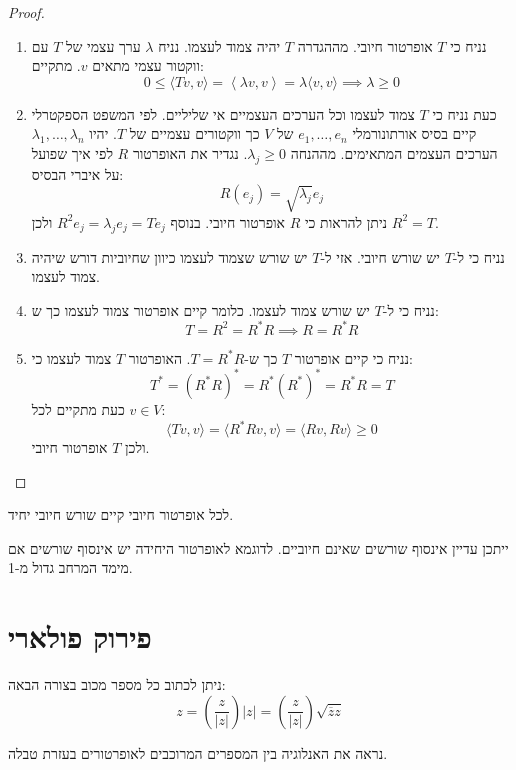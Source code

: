 \documentclass{tstextbook}
\begin{document}
\begin{proof}
  \begin{enumerate}
    \item נניח כי \(T\) אופרטור חיובי. מההגדרה \(T\) יהיה צמוד לעצמו. נניח \(\lambda\) ערך עצמי של \(T\) עם ווקטור עצמי מתאים \(v\). מתקיים: 
$$0\leq\langle Tv,v \rangle =\left\langle  \lambda v,v  \right\rangle =\lambda \langle v,v \rangle \implies \lambda \geq 0$$


    \item כעת נניח כי \(T\) צמוד לעצמו וכל הערכים העצמיים אי שליליים. לפי המשפט הספקטרלי קיים בסיס אורתונורמלי \(e_{1},\dots,e_{n}\) של \(V\) כך ווקטורים עצמיים של \(T\). יהיו \(\lambda_{1},\dots,\lambda_{n}\) הערכים העצמים המתאימים. מההנחה \(\lambda_{j}\geq 0\). נגדיר את האופרטור \(R\) לפי איך שפועל על איברי הבסיס: 
$$R (e_{j})=\sqrt{ \lambda_{j} }e_{j}$$
ניתן להראות כי \(R\) אופרטור חיובי. בנוסף \(R^{2}e_{j}=\lambda_{j}e_{j}=Te_{j}\) ולכן \(R^{2}=T\).


    \item נניח כי ל-\(T\) יש שורש חיובי. אזי ל-\(T\) יש שורש שצמוד לעצמו כיוון שחיוביות דורש שיהיה צמוד לעצמו. 


    \item נניח כי ל-\(T\) יש שורש צמוד לעצמו. כלומר קיים אופרטור צמוד לעצמו כך ש: 
$$T=R^{2}=R^{*}R\implies R=R ^{*}R$$


    \item נניח כי קיים אופרטור \(T\) כך ש-\(T=R^{*}R\). האופרטור \(T\) צמוד לעצמו כי: 
$$T^{*}=(R^{*}R)^{*}=R^{*}(R^{*})^{*}=R^{*}R=T$$
כעת מתקיים לכל \(v \in V\):
$$\langle Tv,v \rangle =\langle R^{*}Rv,v \rangle =\langle Rv,Rv \rangle \geq 0$$
ולכן \(T\) אופרטור חיובי.


  \end{enumerate}
\end{proof}
\begin{proposition}
לכל אופרטור חיובי קיים שורש חיובי יחיד.

\end{proposition}
\begin{remark}
ייתכן עדיין אינסוף שורשים שאינם חיוביים. לדוגמא לאופרטור היחידה יש אינסוף שורשים אם מימד המרחב גדול מ-1.

\end{remark}
\section{פירוק פולארי}

\begin{reminder}
ניתן לכתוב כל מספר מכוב בצורה הבאה:
$$z=\left( \frac{z}{\lvert z \rvert } \right)\lvert z \rvert = \left( \frac{z}{\lvert z \rvert } \right)\sqrt{ \overline{z} z }$$

\end{reminder}
נראה את האנלוגיה בין המספרים המרוכבים לאופרטורים בעזרת טבלה.
\end{document}
